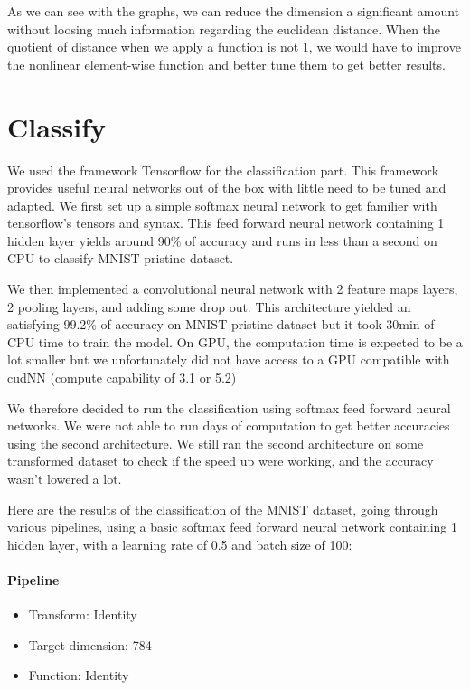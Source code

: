 \documentclass[11pt,a4paper]{article}
\begin{document}
	As we can see with the graphs, we can reduce the dimension a significant amount without loosing much information regarding the euclidean distance. When the quotient of distance when we apply a function is not 1, we would have to improve the nonlinear element-wise function and better tune them to get better results. 
	
	
	\section{Classify}
	
	We used the framework Tensorflow for the classification part. This framework provides useful neural networks out of the box with little need to be tuned and adapted. We first set up a simple softmax neural network to get familier with tensorflow's tensors and syntax. This feed forward neural network containing 1 hidden layer yields around 90\% of accuracy and runs in less than a second on CPU to classify MNIST pristine dataset.
	
	
	We then implemented a convolutional neural network with 2 feature maps layers, 2 pooling layers, and adding some drop out. This architecture yielded an satisfying 99.2\% of accuracy on MNIST pristine dataset but it took 30min of CPU time to train the model. On GPU, the computation time is expected to be a lot smaller but we unfortunately did not have access to a GPU compatible with cudNN (compute capability of 3.1 or 5.2)
	
	
	We therefore decided to run the classification using softmax feed forward neural networks. We were not able to run days of computation to get better accuracies using the second architecture. We still ran the second architecture on some transformed dataset to check if the speed up were working, and the accuracy wasn't lowered a lot. 
	
	
	Here are the results of the classification of the MNIST dataset, going through various pipelines, using a basic softmax feed forward neural network containing 1 hidden layer, with a learning rate of 0.5 and batch size of 100:
	
	
	\paragraph{Pipeline}
	\begin{itemize}
			\item Transform: Identity
			\item Target dimension: 784
			\item Function: Identity
	\end{itemize}
\end{document}
